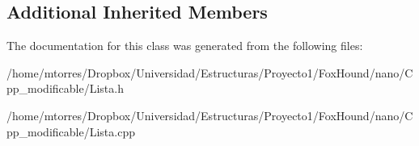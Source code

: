 \subsection*{Additional Inherited Members}


The documentation for this class was generated from the following files\-:\begin{DoxyCompactItemize}
\item 
/home/mtorres/\-Dropbox/\-Universidad/\-Estructuras/\-Proyecto1/\-Fox\-Hound/nano/\-Cpp\-\_\-modificable/Lista.\-h\item 
/home/mtorres/\-Dropbox/\-Universidad/\-Estructuras/\-Proyecto1/\-Fox\-Hound/nano/\-Cpp\-\_\-modificable/Lista.\-cpp\end{DoxyCompactItemize}
